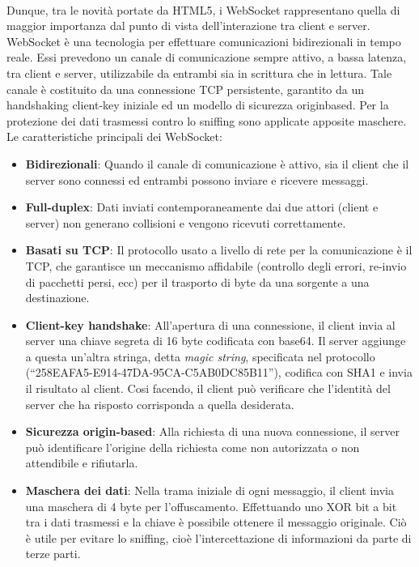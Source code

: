 \\Dunque, tra le novità portate da HTML5, i WebSocket rappresentano quella di maggior importanza dal punto di vista dell'interazione tra client e server. WebSocket è una tecnologia per effettuare comunicazioni bidirezionali in tempo reale. Essi prevedono un canale di comunicazione sempre attivo, a bassa latenza, tra client e server, utilizzabile da entrambi sia in scrittura che in lettura. Tale canale è costituito da una connessione TCP persistente, garantito da un handshaking client-key iniziale ed un modello di sicurezza originbased. Per la protezione dei dati trasmessi contro lo sniffing sono applicate apposite maschere. 
\\Le caratteristiche principali dei WebSocket:
\begin{itemize}
\item \textbf{Bidirezionali}: Quando il canale di comunicazione è attivo, sia il client che il server sono connessi ed entrambi possono inviare e ricevere messaggi.
\item \textbf{Full-duplex}: Dati inviati contemporaneamente dai due attori (client e server) non generano collisioni e vengono ricevuti correttamente.
\item \textbf{Basati su TCP}: Il protocollo usato a livello di rete per la comunicazione è il TCP, che garantisce un meccanismo affidabile (controllo degli errori, re-invio di pacchetti persi, ecc) per il trasporto di byte da una sorgente a una destinazione.
\item \textbf{Client-key handshake}: All'apertura di una connessione, il client invia al server una chiave segreta di 16 byte codificata con base64. Il server aggiunge a questa un'altra stringa, detta \textit{magic string}, specificata nel protocollo (“258EAFA5-E914-47DA-95CA-C5AB0DC85B11”), codifica con SHA1 e invia il risultato al client. Cosi facendo, il client può verificare che l’identità del server che ha risposto corrisponda a quella desiderata.
\item \textbf{Sicurezza origin-based}: Alla richiesta di una nuova connessione, il server può identificare l'origine della richiesta come non autorizzata o non attendibile e rifiutarla.
\item \textbf{Maschera dei dati}: Nella trama iniziale di ogni messaggio, il client invia una maschera di 4 byte per l'offuscamento. Effettuando uno XOR bit a bit tra i dati trasmessi e la chiave è possibile ottenere il messaggio originale. Ciò è utile per evitare lo sniffing, cioè l'intercettazione di informazioni da parte di terze parti.
\end{itemize}
